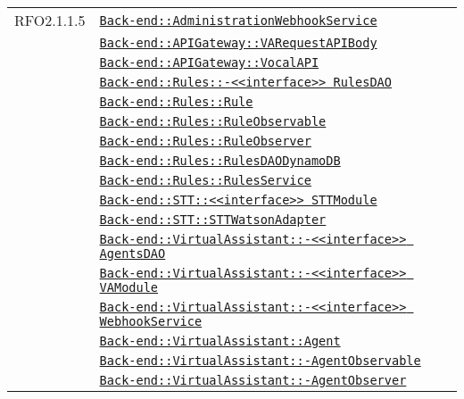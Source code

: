 \begin{longtable}{|>{\centering}m{3cm}|m{10cm}<{\centering}|}
RFO2.1.1.5 & \hyperref[Back-end::AdministrationWebhookService]{\texttt{Back-end::AdministrationWebhookService}}\\
& \hyperref[Back-end::APIGateway::VARequestAPIBody]{\texttt{Back-end::APIGateway::VARequestAPIBody}}\\
& \hyperref[Back-end::APIGateway::VocalAPI]{\texttt{Back-end::APIGateway::VocalAPI}}\\
& \hyperref[Back-end::Rules::<<interface>> RulesDAO]{\texttt{Back-end::Rules::-\linebreak <<interface>> RulesDAO}}\\
& \hyperref[Back-end::Rules::Rule]{\texttt{Back-end::Rules::Rule}}\\
& \hyperref[Back-end::Rules::RuleObservable]{\texttt{Back-end::Rules::RuleObservable}}\\
& \hyperref[Back-end::Rules::RuleObserver]{\texttt{Back-end::Rules::RuleObserver}}\\
& \hyperref[Back-end::Rules::RulesDAODynamoDB]{\texttt{Back-end::Rules::RulesDAODynamoDB}}\\
& \hyperref[Back-end::Rules::RulesService]{\texttt{Back-end::Rules::RulesService}}\\
& \hyperref[Back-end::STT::<<interface>> STTModule]{\texttt{Back-end::STT::<<interface>> STTModule}}\\
& \hyperref[Back-end::STT::STTWatsonAdapter]{\texttt{Back-end::STT::STTWatsonAdapter}}\\
& \hyperref[Back-end::VirtualAssistant::<<interface>> AgentsDAO]{\texttt{Back-end::VirtualAssistant::-\linebreak <<interface>> AgentsDAO}}\\
& \hyperref[Back-end::VirtualAssistant::<<interface>> VAModule]{\texttt{Back-end::VirtualAssistant::-\linebreak <<interface>> VAModule}}\\
& \hyperref[Back-end::VirtualAssistant::<<interface>> WebhookService]{\texttt{Back-end::VirtualAssistant::-\linebreak <<interface>> WebhookService}}\\
& \hyperref[Back-end::VirtualAssistant::Agent]{\texttt{Back-end::VirtualAssistant::Agent}}\\
& \hyperref[Back-end::VirtualAssistant::AgentObservable]{\texttt{Back-end::VirtualAssistant::-\linebreak AgentObservable}}\\
& \hyperref[Back-end::VirtualAssistant::AgentObserver]{\texttt{Back-end::VirtualAssistant::-\linebreak AgentObserver}}\\

\end{longtable}
